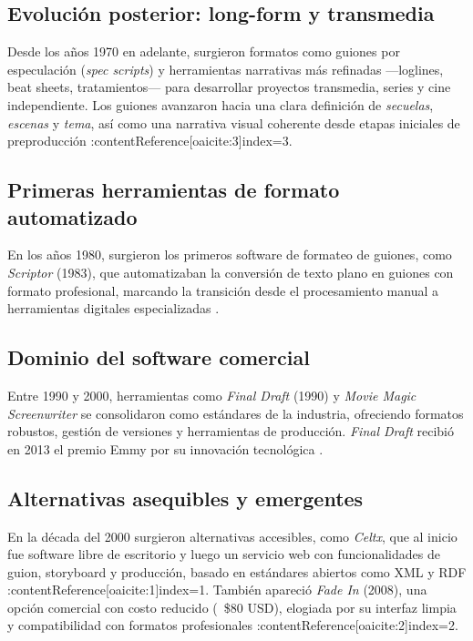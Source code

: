 \documentclass[12pt]{article}
\begin{document}
	\subsection{Evolución posterior: long-form y transmedia}
	Desde los años 1970 en adelante, surgieron formatos como guiones por especulación (\textit{spec scripts}) y herramientas narrativas más refinadas —loglines, beat sheets, tratamientos— para desarrollar proyectos transmedia, series y cine independiente. Los guiones avanzaron hacia una clara definición de \textit{secuelas}, \textit{escenas} y \textit{tema}, así como una narrativa visual coherente desde etapas iniciales de preproducción :contentReference[oaicite:3]{index=3}.

	\subsection{Primeras herramientas de formato automatizado}
	En los años 1980, surgieron los primeros software de formateo de guiones, como \textit{Scriptor} (1983), que automatizaban la conversión de texto plano en guiones con formato profesional, marcando la transición desde el procesamiento manual a herramientas digitales especializadas \parencite{screenwriting_history_scriptor}.

	\subsection{Dominio del software comercial}
	Entre 1990 y 2000, herramientas como \textit{Final Draft} (1990) y \textit{Movie Magic Screenwriter} se consolidaron como estándares de la industria, ofreciendo formatos robustos, gestión de versiones y herramientas de producción. \textit{Final Draft} recibió en 2013 el premio Emmy por su innovación tecnológica \parencite{turn0search4,turn0search22}.

	\subsection{Alternativas asequibles y emergentes}
	En la década del 2000 surgieron alternativas accesibles, como \textit{Celtx}, que al inicio fue software libre de escritorio y luego un servicio web con funcionalidades de guion, storyboard y producción, basado en estándares abiertos como XML y RDF :contentReference[oaicite:1]{index=1}. También apareció \textit{Fade In} (2008), una opción comercial con costo reducido (~\$80 USD), elogiada por su interfaz limpia y compatibilidad con formatos profesionales :contentReference[oaicite:2]{index=2}.
\end{document}
